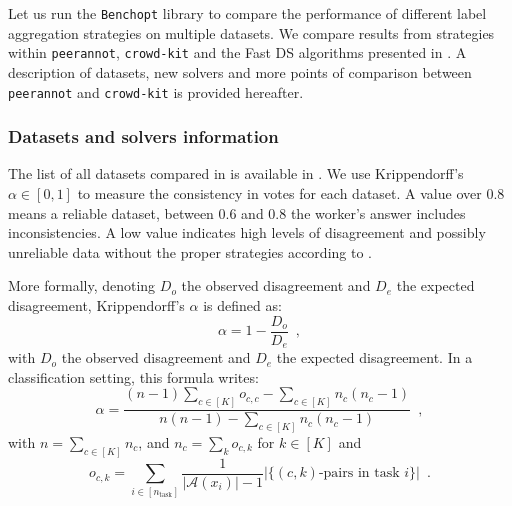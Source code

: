 Let us run the \texttt{Benchopt} library to compare the performance of different label aggregation strategies on multiple datasets.
We compare results from strategies within \texttt{peerannot}, \texttt{crowd-kit} and the Fast DS algorithms presented in \citet{sinha2018fast}.
A description of datasets, new solvers and more points of comparison between \texttt{peerannot} and \texttt{crowd-kit} is provided hereafter.

\subsubsection{Datasets and solvers information}

The list of all datasets compared in  is available in .
We use Krippendorff's $\alpha\in[0,1]$ \citep{krippendorff1980validity} to measure the consistency in votes for each dataset.
A value over $0.8$ means a reliable dataset, between $0.6$ and $0.8$ the worker's answer includes inconsistencies.
A low value indicates high levels of disagreement and possibly unreliable data without the proper strategies according to \citet{krippendorff2004reliability}.

More formally, denoting $D_o$ the observed disagreement and $D_e$ the expected disagreement, Krippendorff's $\alpha$ is defined as:
\begin{equation}
    \alpha=1-\frac{D_o}{D_e} \enspace,
\end{equation}
with $D_o$ the observed disagreement and $D_e$ the expected disagreement.
In a classification setting, this formula writes:
\begin{equation}\label{eq:alphakripp}
    \alpha=\frac{(n-1)\displaystyle\sum_{c\in[K]}o_{c,c} - \displaystyle\sum_{c\in [K]} n_c(n_c-1)}{n(n-1) - \displaystyle\sum_{c\in [K]} n_c(n_c-1)} \enspace,
\end{equation}
with $n=\sum_{c\in [K]} n_c$, and $n_c=\sum_{k}o_{c,k}$ for $k\in [K]$ and
\[o_{c,k}= \sum_{i\in [n_\text{task}]}\frac{1}{|\mathcal{A}(x_i)|-1}|\{(c,k)\text{-pairs in task }i\}| \enspace.\]


